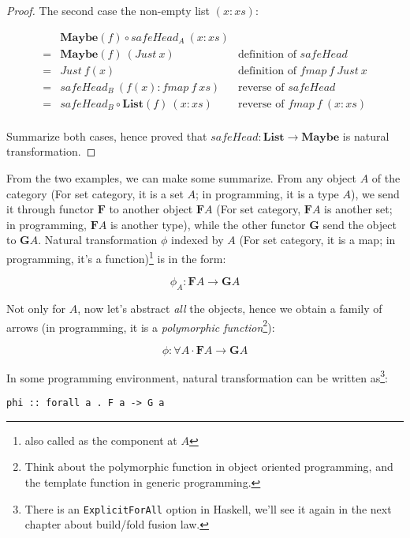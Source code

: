 \documentclass{article}
\begin{document}
\begin{example}
\begin{proof}
The second case the non-empty list $(x:xs)$:

\[
\begin{array}{cll}
  & \mathbf{Maybe}(f) \circ safeHead_A\ (x:xs) & \\
= & \mathbf{Maybe}(f)\ (Just\ x) & \text{definition of $safeHead$} \\
= & Just\ f(x) & \text{definition of $fmap\ f\ Just\ x$} \\
= & safeHead_B\ (f(x) : fmap\ f\ xs) & \text{reverse of $safeHead$} \\
= & safeHead_B \circ \mathbf{List}(f)\ (x:xs) & \text{reverse of $fmap\ f\ (x:xs)$} \\
\end{array}
\]

Summarize both cases, hence proved that $safeHead : \mathbf{List} \to \mathbf{Maybe}$ is natural transformation.
\end{proof}
\end{example}

From the two examples, we can make some summarize. From any object $A$ of the category (For set category, it is a set $A$; in programming, it is a type $A$), we send it through functor $\mathbf{F}$ to another object $\mathbf{F}A$ (For set category, $\mathbf{F}A$ is another set; in programming, $\mathbf{F}A$ is another type), while the other functor $\mathbf{G}$ send the object to $\mathbf{G}A$. Natural transformation $\phi$ indexed by $A$ (For set category, it is a map; in programming, it's a function)\footnote{also called as the component at $A$} is in the form:

\[
\phi_A : \mathbf{F} A \to \mathbf{G} A
\]

Not only for $A$, now let's abstract {\em all} the objects, hence we obtain a family of arrows (in programming, it is a {\em polymorphic function}\footnote{Think about the polymorphic function in object oriented programming, and the template function in generic programming.}):

\[
\phi : \forall A \cdot \mathbf{F} A \to \mathbf{G} A
\]

In some programming environment, natural transformation can be written as\footnote{There is an \texttt{ExplicitForAll} option in Haskell, we'll see it again in the next chapter about build/fold fusion law.}:

\lstset{frame=single}
\begin{lstlisting}
phi :: forall a . F a -> G a
\end{lstlisting}
\end{document}
